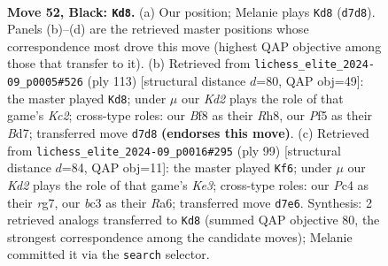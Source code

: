 \documentclass[11pt]{article}
\begin{document}
\clearpage

\begin{figure}[p]\centering
\begin{subfigure}{0.46\textwidth}\centering
\resizebox{\linewidth}{!}{%
\newchessgame
\chessboard[
  setfen={2r2b1r/3k2p1/p1p5/Pp1b1p1p/2p2P1P/2B1P1P1/1P5N/R1K3R1 b - - 6 52},
  showmover=false,
  pgfstyle=straightmove, color=movearrow, markmove={d7-d8}
]}
\caption{}
\end{subfigure}\hfill
\begin{subfigure}{0.46\textwidth}\centering
\resizebox{\linewidth}{!}{%
\newchessgame
\chessboard[
  setfen={4r2r/2kb1p2/4p1p1/1p1pP2p/pP3P2/P1P1R1P1/3RB2P/3K4 b - - 54 57},
  showmover=false,
  pgfstyle=straightmove, color=movearrow, markmove={c7-d8}
]}
\caption{}
\end{subfigure}
\\[4pt]
\begin{subfigure}{0.46\textwidth}\centering
\resizebox{\linewidth}{!}{%
\newchessgame
\chessboard[
  setfen={8/6R1/r2bk1p1/1r2pp1p/1p5P/1P2B1P1/P3RP2/6K1 b - - 7 50},
  showmover=false,
  pgfstyle=straightmove, color=movearrow, markmove={e6-f6}
]}
\caption{}
\end{subfigure}\hfill

\caption{\textbf{Move 52, Black: \texttt{Kd8}.} (a) Our position; Melanie plays \texttt{Kd8} (\texttt{d7d8}). Panels (b)--(d) are the retrieved master positions whose correspondence most drove this move (highest QAP objective among those that transfer to it). (b) Retrieved from \texttt{lichess\_elite\_2024-09\_p0005\#526} (ply 113) [structural distance $d$=80, QAP obj=49]: the master played \texttt{Kd8}; under $\mu$ our \emph{Kd2} plays the role of that game's \emph{Kc2}; cross-type roles: our \emph{B}f8 as their \emph{R}h8, our \emph{P}f5 as their \emph{B}d7; transferred move \texttt{d7d8} \textbf{(endorses this move)}. (c) Retrieved from \texttt{lichess\_elite\_2024-09\_p0016\#295} (ply 99) [structural distance $d$=84, QAP obj=11]: the master played \texttt{Kf6}; under $\mu$ our \emph{Kd2} plays the role of that game's \emph{Ke3}; cross-type roles: our \emph{P}c4 as their \emph{r}g7, our \emph{b}c3 as their \emph{R}a6; transferred move \texttt{d7e6}. Synthesis: 2 retrieved analogs transferred to \texttt{Kd8} (summed QAP objective 80, the strongest correspondence among the candidate moves); Melanie committed it via the \texttt{search} selector.}
\label{fig:thought-m103}
\end{figure}

\clearpage
\end{document}
